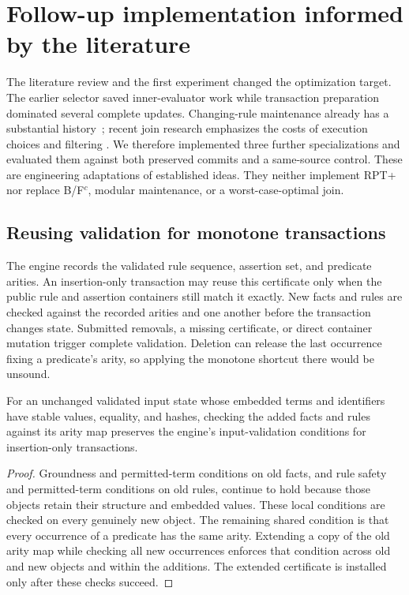 \section{Follow-up implementation informed by the literature}
\label{sec:followup}
The literature review and the first experiment changed the optimization target.
The earlier selector saved inner-evaluator work while transaction preparation
dominated several complete updates. Changing-rule maintenance already has a
substantial history~\cite{volz2003maintenance,kotowski2011,xu2023}; recent join
research emphasizes the costs of execution choices and filtering
\cite{qiao2026}. We therefore implemented three further specializations and
evaluated them against both preserved commits and a same-source control.
These are engineering adaptations of established ideas. They neither implement
RPT+ nor replace B/F$^c$, modular maintenance, or a worst-case-optimal join.

\subsection{Reusing validation for monotone transactions}
The engine records the validated rule sequence, assertion set, and predicate
arities. An insertion-only transaction may reuse this certificate only when
the public rule and assertion containers still match it exactly. New facts and
rules are checked against the recorded arities and one another before the
transaction changes state. Submitted removals, a missing certificate, or direct
container mutation trigger complete validation. Deletion can release the last
occurrence fixing a predicate's arity, so applying the monotone shortcut there
would be unsound.

\begin{proposition}
For an unchanged validated input state whose embedded terms and identifiers
have stable values, equality, and hashes, checking the added facts and rules
against its arity map preserves the engine's input-validation conditions for
insertion-only transactions.
\end{proposition}
\begin{proof}
Groundness and permitted-term conditions on old facts, and rule safety and
permitted-term conditions on old rules, continue to hold because those objects
retain their structure and embedded values. These local conditions are checked on
every genuinely new object. The remaining shared condition is that every
occurrence of a predicate has the same arity. Extending a copy of the old arity
map while checking all new occurrences enforces that condition across old and
new objects and within the additions. The extended certificate is installed
only after these checks succeed.
\end{proof}

